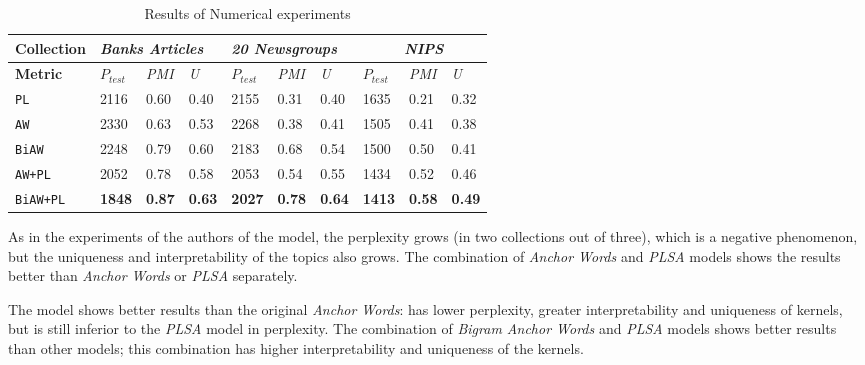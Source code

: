 \documentclass[runningheads,a4paper]{llncs}
\begin{document}
	\begin{table}
		\centering
		\caption{Results of Numerical experiments}
		\label{tab:res}
		\begin{tabular}{|l|l|l|l|l|l|l|l|l|l|}
			\hline
			\textbf{Collection} & \multicolumn{3}{l|}{\textit{\textbf{Banks Articles}}}    & \multicolumn{3}{l|}{\textit{\textbf{20 Newsgroups}}} & \multicolumn{3}{l|}{\textit{\textbf{~~~~~NIPS}}}    \\ \hline
			\textbf{Metric}   & \textit{$P_{test}$} & \textit{PMI}    & \textit{U}    & \textit{$P_{test}$}  & \textit{PMI}    & \textit{U}    & \textit{$P_{test}$} & \textit{PMI}    & \textit{U}    \\ \hline
			\texttt{PL}        & 2116                & 0.60          & 0.40          & 2155                 & 0.31          & 0.40          & 1635                & 0.21          & 0.32          \\ \hline
			\texttt{AW}        & 2330                & 0.63          & 0.53          & 2268                 & 0.38          & 0.41          & 1505                & 0.41          & 0.38          \\ \hline
			\texttt{BiAW}     & 2248                & 0.79          & 0.60          & 2183                 & 0.68          & 0.54          & 1500                &  0.50          &  0.41          \\ \hline
			\texttt{AW+PL}     & 2052                & 0.78          & 0.58          & 2053                 & 0.54          & 0.55          & 1434                & 0.52          & 0.46          \\ \hline
			\texttt{BiAW+PL}  & \textbf{1848}       & \textbf{0.87} & \textbf{0.63} & \textbf{2027}        & \textbf{0.78} & \textbf{0.64} & \textbf{1413}       & \textbf{0.58} & \textbf{0.49} \\ \hline
		\end{tabular}
	\end{table}
	
	As in the experiments of the authors of the  model, the perplexity grows (in two collections out of three), which is a negative phenomenon, but the  uniqueness and interpretability of the topics also grows. The combination of \textit{Anchor Words} and \textit{PLSA} models shows the results better than \textit{Anchor Words} or \textit{PLSA} separately.
	
	The model shows better results than the original \textit{Anchor Words}: has lower perplexity, greater interpretability and uniqueness of kernels, but is still inferior to the  \textit{PLSA} model in perplexity. The combination of  \textit{Bigram Anchor Words} and \textit{PLSA} models shows better results than other models; this combination has higher interpretability and uniqueness of the kernels.
	
\end{document}
